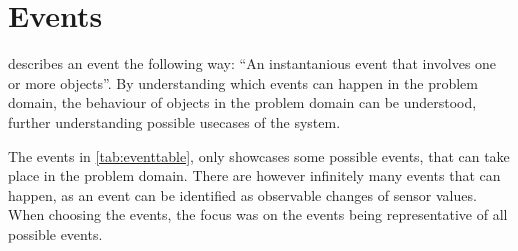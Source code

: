 \section{Events}\label{sec:events}

\citet{OOAD} describes an event the following way: \enquote{An instantanious event that involves one or more objects}. By understanding which events can happen in the problem domain, the behaviour of objects in the problem domain can be understood, further understanding possible usecases of the system.

The events in \cref{tab:eventtable}, only showcases some possible events, that can take place in the problem domain. There are however infinitely many events that can happen, as an event can be identified as observable changes of sensor values. When choosing the events, the focus was on the events being representative of all possible events.





